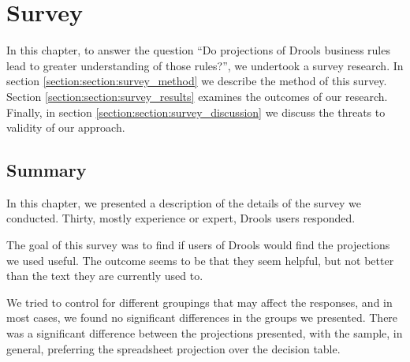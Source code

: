 \chapter{Survey}
\label{chapter:Survey}

In this chapter, to answer the question ``Do projections of Drools business rules lead to greater understanding of those rules?'', we undertook a survey research.
In section \ref{section:section:survey_method} we describe the method of this survey.
Section \ref{section:section:survey_results} examines the outcomes of our research.
Finally, in section \ref{section:section:survey_discussion} we discuss the threats to validity of our approach.


\newpage

\newpage

\newpage

\section{Summary}
In this chapter, we presented a description of the details of the survey we conducted.
Thirty, mostly experience or expert, Drools users responded. 

The goal of this survey was to find if users of Drools would find the projections we used useful.
The outcome seems to be that they seem helpful, but not better than the text they are currently used to.

We tried to control for different groupings that may affect the responses, and in most cases, we found no significant differences in the groups we presented.
There was a significant difference between the projections presented, with the sample, in general, preferring the spreadsheet projection over the decision table. 
